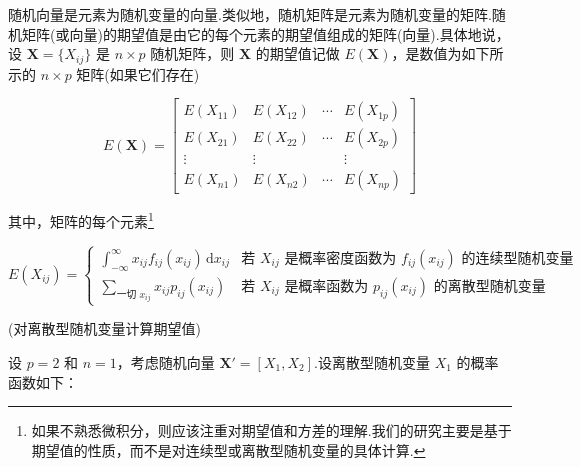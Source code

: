 随机向量是元素为随机变量的向量.类似地，随机矩阵是元素为随机变量的矩阵.随机矩阵(或向量)的期望值是由它的每个元素的期望值组成的矩阵(向量).具体地说，设 $\bm{X}=\{X_{ij}\}$ 是 $n\times p$ 随机矩阵，则 $\bm{X}$ 的期望值记做 $E(\bm{X})$，是数值为如下所示的 $n\times p$ 矩阵(如果它们存在)

\label{eq:2-23}
\begin{equation}
E(\bm{X})=
\begin{bmatrix}
E(X_{11}) & E(X_{12}) & \cdots & E(X_{1p})\\
E(X_{21}) & E(X_{22}) & \cdots & E(X_{2p})\\
\vdots & \vdots & & \vdots\\
E(X_{n1}) & E(X_{n2}) & \cdots & E(X_{np})
\end{bmatrix}
\tag{2-23}
\end{equation}

其中，矩阵的每个元素\footnote{如果不熟悉微积分，则应该注重对期望值和方差的理解.我们的研究主要是基于期望值的性质，而不是对连续型或离散型随机变量的具体计算.}

\[
E(X_{ij})=
\begin{cases}
\displaystyle\int_{-\infty}^{\infty}x_{ij}f_{ij}(x_{ij})\,\mathrm{d}x_{ij} & \text{若 } X_{ij} \text{ 是概率密度函数为 } f_{ij}(x_{ij}) \text{ 的连续型随机变量}\\[2ex]
\displaystyle\sum_{\text{一切 }x_{ij}}x_{ij}p_{ij}(x_{ij}) & \text{若 } X_{ij} \text{ 是概率函数为 } p_{ij}(x_{ij}) \text{ 的离散型随机变量}
\end{cases}
\]

 \quad (对离散型随机变量计算期望值)

设 $p=2$ 和 $n=1$，考虑随机向量 $\bm{X}'=[X_1,X_2]$.设离散型随机变量 $X_1$ 的概率函数如下：
